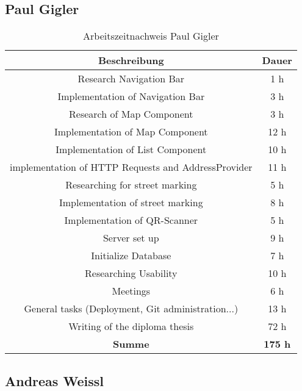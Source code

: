 \subsection{Paul Gigler}

\begin{table}[h!]
  \centering
  \begin{tabular}{|c|c|}
  \hline
  \multicolumn{1}{|c|}{\textbf{Beschreibung}}  &
  \multicolumn{1}{c|}{\textbf{Dauer}}  \\ \hline
    Research Navigation Bar & 1 h \\ \hline
    Implementation of Navigation Bar & 3 h \\ \hline
    Research of Map Component & 3 h \\ \hline
    Implementation of Map Component & 12 h \\ \hline
    Implementation of List Component & 10 h \\ \hline
    implementation of HTTP Requests and AddressProvider & 11 h \\ \hline
    Researching for street marking & 5 h \\ \hline
    Implementation of street marking & 8 h \\ \hline
    Implementation of QR-Scanner & 5 h \\ \hline
    Server set up & 9 h \\ \hline
    Initialize Database & 7 h \\ \hline
    Researching Usability & 10 h \\ \hline
    Meetings & 6 h \\ \hline
    General tasks (Deployment, Git administration...) & 13 h \\ \hline
    Writing of the diploma thesis & 72 h \\ \hline
    {\textbf{Summe}} & \textbf{175 h} \\ \hline
   \end{tabular}
  \caption{Arbeitszeitnachweis Paul Gigler}
  \end{table}

  \pagebreak

\subsection{Andreas Weissl}

